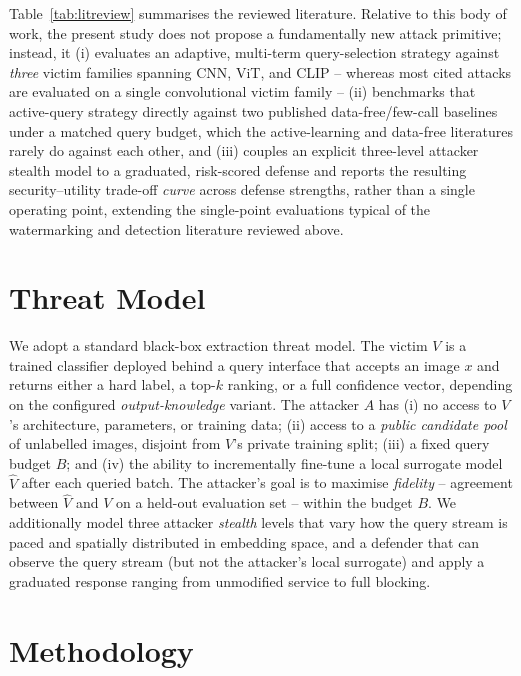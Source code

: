 \documentclass[journal,10pt]{IEEEtran}
\begin{document}
Table~\ref{tab:litreview} summarises the reviewed literature. Relative to this body of work, the
present study does not propose a fundamentally new attack primitive; instead, it (i) evaluates an
adaptive, multi-term query-selection strategy against \emph{three} victim families spanning CNN,
ViT, and CLIP -- whereas most cited attacks are evaluated on a single convolutional victim family
-- (ii) benchmarks that active-query strategy directly against two published data-free/few-call
baselines under a matched query budget, which the active-learning and data-free literatures
rarely do against each other, and (iii) couples an explicit three-level attacker stealth model to
a graduated, risk-scored defense and reports the resulting security--utility trade-off \emph{curve}
across defense strengths, rather than a single operating point, extending the single-point
evaluations typical of the watermarking and detection literature reviewed above.

\section{Threat Model}
\label{sec:threat}

We adopt a standard black-box extraction threat model. The victim $V$ is a trained classifier
deployed behind a query interface that accepts an image $x$ and returns either a hard label, a
top-$k$ ranking, or a full confidence vector, depending on the configured \emph{output-knowledge}
variant. The attacker $A$ has (i) no access to $V$'s architecture, parameters, or training data;
(ii) access to a \emph{public candidate pool} of unlabelled images, disjoint from $V$'s private
training split; (iii) a fixed query budget $B$; and (iv) the ability to incrementally fine-tune a
local surrogate model $\hat V$ after each queried batch. The attacker's goal is to maximise
\emph{fidelity} -- agreement between $\hat V$ and $V$ on a held-out evaluation set -- within the
budget $B$. We additionally model three attacker \emph{stealth} levels that vary how the query
stream is paced and spatially distributed in embedding space, and a defender that can observe the
query stream (but not the attacker's local surrogate) and apply a graduated response ranging from
unmodified service to full blocking.

\section{Methodology}
\label{sec:method}
\end{document}
